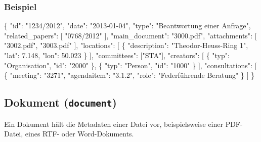 \documentclass[,a4paper]{article}
\newenvironment{Shaded}{}{}
\newcommand{\DataTypeTok}[1]{\textcolor[rgb]{0.56,0.13,0.00}{{#1}}}
\newcommand{\FloatTok}[1]{\textcolor[rgb]{0.25,0.63,0.44}{{#1}}}
\newcommand{\StringTok}[1]{\textcolor[rgb]{0.25,0.44,0.63}{{#1}}}
\newcommand{\NormalTok}[1]{{#1}}
\begin{document}
\subsubsection{Beispiel}

\begin{Shaded}
\begin{Highlighting}[]
\NormalTok{\{}
    \DataTypeTok{"id"}\NormalTok{: }\StringTok{"1234/2012"}\NormalTok{,}
    \DataTypeTok{"date"}\NormalTok{: }\StringTok{"2013-01-04"}\NormalTok{,}
    \DataTypeTok{"type"}\NormalTok{: }\StringTok{"Beantwortung einer Anfrage"}\NormalTok{,}
    \DataTypeTok{"related_papers"}\NormalTok{: [}
        \StringTok{"0768/2012"}
    \NormalTok{],}
    \DataTypeTok{"main_document"}\NormalTok{: }\StringTok{"3000.pdf"}\NormalTok{,}
    \DataTypeTok{"attachments"}\NormalTok{: [}
        \StringTok{"3002.pdf"}\NormalTok{,}
        \StringTok{"3003.pdf"}
    \NormalTok{],}
    \DataTypeTok{"locations"}\NormalTok{: [}
        \NormalTok{\{}
            \DataTypeTok{"description"}\NormalTok{: }\StringTok{"Theodor-Heuss-Ring 1"}\NormalTok{,}
            \DataTypeTok{"lat"}\NormalTok{: }\FloatTok{7.148}\NormalTok{,}
            \DataTypeTok{"lon"}\NormalTok{: }\FloatTok{50.023}
        \NormalTok{\}}
    \NormalTok{],}
    \DataTypeTok{"committees"}\NormalTok{: [}\StringTok{"STA"}\NormalTok{],}
    \DataTypeTok{"creators"}\NormalTok{: [}
        \NormalTok{\{}
            \DataTypeTok{"typ"}\NormalTok{: }\StringTok{"Organisation"}\NormalTok{,}
            \DataTypeTok{"id"}\NormalTok{: }\StringTok{"2000"}
        \NormalTok{\},}
        \NormalTok{\{}
            \DataTypeTok{"typ"}\NormalTok{: }\StringTok{"Person"}\NormalTok{,}
            \DataTypeTok{"id"}\NormalTok{: }\StringTok{"1000"}
        \NormalTok{\}}
    \NormalTok{],}
    \DataTypeTok{"consultations"}\NormalTok{: [}
        \NormalTok{\{}
            \DataTypeTok{"meeting"}\NormalTok{: }\StringTok{"3271"}\NormalTok{,}
            \DataTypeTok{"agendaitem"}\NormalTok{: }\StringTok{"3.1.2"}\NormalTok{,}
            \DataTypeTok{"role"}\NormalTok{: }\StringTok{"Federführende Beratung"}
        \NormalTok{\}}
    \NormalTok{]}
\NormalTok{\}}
\end{Highlighting}
\end{Shaded}

\subsection{Dokument (\texttt{document})}

Ein Dokument hält die Metadaten einer Datei vor, beispielsweise einer
PDF-Datei, eines RTF- oder Word-Dokuments.
\end{document}

